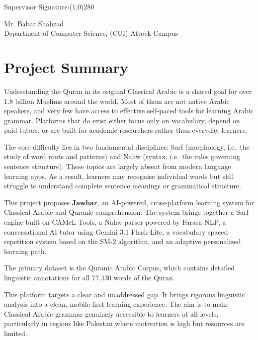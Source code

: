 \documentclass[A4paper,12pt]{article}
\begin{document}
\vspace{0.1in}

Supervisor Signature:\line(1,0){280}
\begin{center}
\normalsize{Mr. Babar Shahzad\\
Department of Computer Science, (CUI) Attock Campus}
\end{center}
\vspace{0.1in}

\newpage
\section*{Project Summary}

Understanding the Quran in its original Classical Arabic is a shared goal for over 1.8 billion Muslims around the world. Most of them are not native Arabic speakers, and very few have access to effective self-paced tools for learning Arabic grammar. Platforms that do exist either focus only on vocabulary, depend on paid tutors, or are built for academic researchers rather than everyday learners.

The core difficulty lies in two fundamental disciplines: Sarf (morphology, i.e.\ the study of word roots and patterns) and Nahw (syntax, i.e.\ the rules governing sentence structure). These topics are largely absent from modern language learning apps. As a result, learners may recognise individual words but still struggle to understand complete sentence meanings or grammatical structure.

This project proposes \textbf{Jawhar}, an AI-powered, cross-platform learning system for Classical Arabic and Quranic comprehension. The system brings together a Sarf engine built on CAMeL Tools, a Nahw parser powered by Farasa NLP, a conversational AI tutor using Gemini 3.1 Flash-Lite, a vocabulary spaced repetition system based on the SM-2 algorithm, and an adaptive personalized learning path.

The primary dataset is the Quranic Arabic Corpus, which contains detailed linguistic annotations for all 77,430 words of the Quran.

This platform targets a clear and unaddressed gap. It brings rigorous linguistic analysis into a clean, mobile-first learning experience. The aim is to make Classical Arabic grammar genuinely accessible to learners at all levels, particularly in regions like Pakistan where motivation is high but resources are limited.
\end{document}
